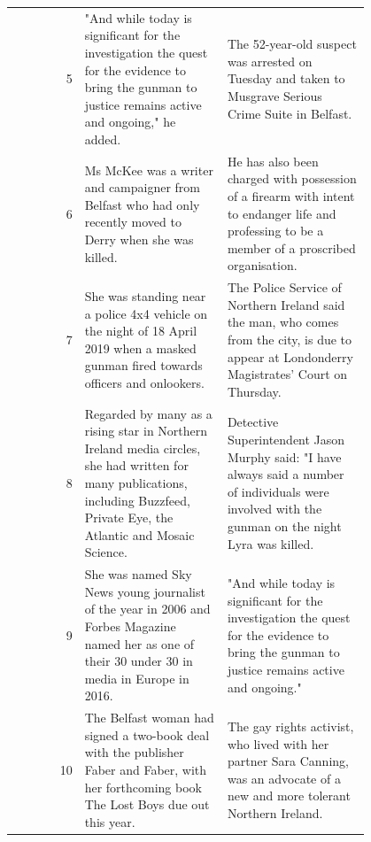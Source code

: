 \begin{table}[!htbp]
\begin{tabular}{r | p{0.4\linewidth} | p{0.4\linewidth} }
        5\vspace{-2px} & \tiny{"And while today is significant for the investigation the quest for the evidence to bring the gunman to justice remains active and ongoing," he added.}\vspace{-2px} & \tiny{The 52-year-old suspect was arrested on Tuesday and taken to Musgrave Serious Crime Suite in Belfast.}\vspace{-2px}\\
        6\vspace{-2px} & \tiny{Ms McKee was a writer and campaigner from Belfast who had only recently moved to Derry when she was killed.}\vspace{-2px}& \tiny{He has also been charged with possession of a firearm with intent to endanger life and professing to be a member of a proscribed organisation.}\vspace{-2px}\\
        7\vspace{-2px} & \tiny{She was standing near a police 4x4 vehicle on the night of 18 April 2019 when a masked gunman fired towards officers and onlookers.}\vspace{-2px} & \tiny{The Police Service of Northern Ireland said the man, who comes from the city, is due to appear at Londonderry Magistrates' Court on Thursday.}\vspace{-2px} \\
        8\vspace{-2px} & \tiny{Regarded by many as a rising star in Northern Ireland media circles, she had written for many publications, including Buzzfeed, Private Eye, the Atlantic and Mosaic Science.}\vspace{-2px} & \tiny{Detective Superintendent Jason Murphy said: "I have always said a number of individuals were involved with the gunman on the night Lyra was killed.}\vspace{-2px} \\
        9\vspace{-2px} & \tiny{She was named Sky News young journalist of the year in 2006 and Forbes Magazine named her as one of their 30 under 30 in media in Europe in 2016.}\vspace{-2px} & \tiny{"And while today is significant for the investigation the quest for the evidence to bring the gunman to justice remains active and ongoing."}\vspace{-2px} \\
        10\vspace{-2px} & \tiny{The Belfast woman had signed a two-book deal with the publisher Faber and Faber, with her forthcoming book The Lost Boys due out this year.}\vspace{-2px} & \tiny{The gay rights activist, who lived with her partner Sara Canning, was an advocate of a new and more tolerant Northern Ireland.}\vspace{-2px} \\

\end{tabular}
\end{table}
